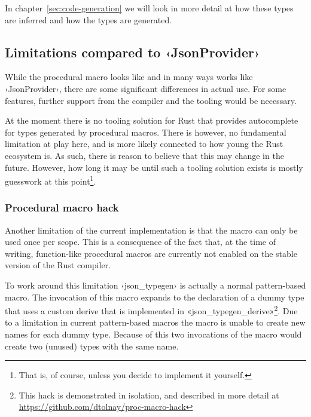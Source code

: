 In chapter~\ref{sec:code-generation} we will look in more detail at how these types are inferred and how the types are generated.

\subsection{Limitations compared to ‹JsonProvider›}
\label{sec:macro-limitations}

While the procedural macro looks like and in many ways works like ‹JsonProvider›, there are some significant differences in actual use. For some features, further support from the compiler and the tooling would be necessary.

At the moment there is no tooling solution for Rust that provides autocomplete for types generated by procedural macros. There is however, no fundamental limitation at play here, and is more likely connected to how young the Rust ecosystem is. As such, there is reason to believe that this may change in the future. However, how long it may be until such a tooling solution exists is mostly guesswork at this point\footnote{That is, of course, unless you decide to implement it yourself.}.


\subsubsection{Procedural macro hack}

Another limitation of the current implementation is that the macro can only be used once per scope. This is a consequence of the fact that, at the time of writing, function-like procedural macros are currently not enabled on the stable version of the Rust compiler.

To work around this limitation ‹json_typegen› is actually a normal pattern-based macro. The invocation of this macro expands to the declaration of a dummy type that uses a custom derive that is implemented in «json_typegen_derive»\footnote{This hack is demonstrated in isolation, and described in more detail at \url{https://github.com/dtolnay/proc-macro-hack}}. Due to a limitation in current pattern-based macros the macro is unable to create new names for each dummy type. Because of this two invocations of the macro would create two (unused) types with the same name.

